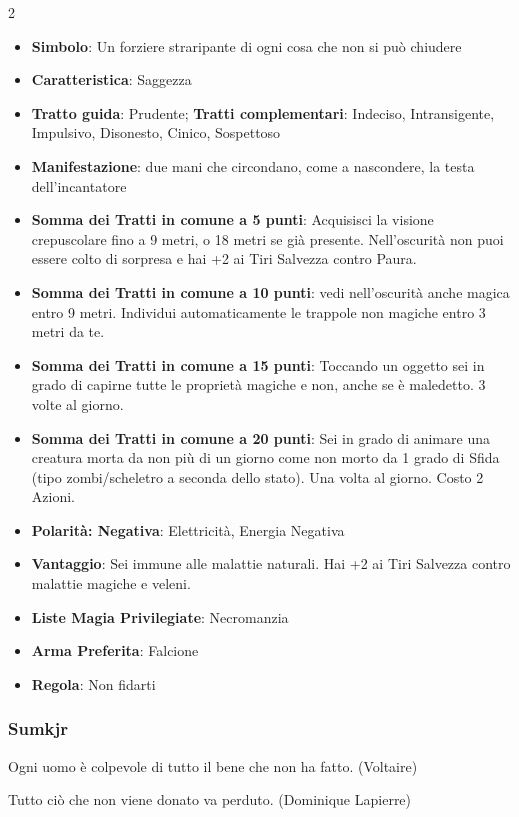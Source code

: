 \begin{multicols}{2}
\begin{itemize}[leftmargin=*] \setlength{\itemsep}{0pt}
\item \textbf{Simbolo}: Un forziere straripante di ogni cosa che non si può chiudere
\item \textbf{Caratteristica}: Saggezza
\item \textbf{Tratto guida}: Prudente; \textbf{Tratti complementari}: Indeciso, Intransigente, Impulsivo, Disonesto, Cinico, Sospettoso
\item \textbf{Manifestazione}: due mani che circondano, come a nascondere, la testa dell'incantatore
\item \textbf{Somma dei Tratti in comune a 5 punti}: Acquisisci la visione crepuscolare fino a 9 metri, o 18 metri se già presente. Nell'oscurità non puoi essere colto di sorpresa e hai +2 ai Tiri Salvezza contro Paura.
\item \textbf{Somma dei Tratti in comune a 10 punti}: vedi nell'oscurità anche magica entro 9 metri. Individui automaticamente le trappole non magiche entro 3 metri da te.
\item \textbf{Somma dei Tratti in comune a 15 punti}: Toccando un oggetto sei in grado di capirne tutte le proprietà magiche e non, anche se è maledetto. 3 volte al giorno.
\item \textbf{Somma dei Tratti in comune a 20 punti}: Sei in grado di animare una creatura morta da non più di un giorno come non morto da 1 grado di Sfida (tipo zombi/scheletro a seconda dello stato). Una volta al giorno. Costo 2 Azioni.
\item \textbf{Polarità: Negativa}: Elettricità, Energia Negativa
\item \textbf{Vantaggio}: Sei immune alle malattie naturali. Hai +2 ai Tiri Salvezza contro malattie magiche e veleni.
\item \textbf{Liste Magia Privilegiate}: Necromanzia
\item \textbf{Arma Preferita}: Falcione
\item \textbf{Regola}: Non fidarti
\end{itemize}

\subsubsection{Sumkjr}\label{sumkjr}\hypertarget{sumkjr}{}

\begin{enfasi}{
Ogni uomo è colpevole di tutto il bene che non ha fatto. (Voltaire)

\medskip

Tutto ciò che non viene donato va perduto. (Dominique Lapierre)

}\end{enfasi}


\end{multicols}
